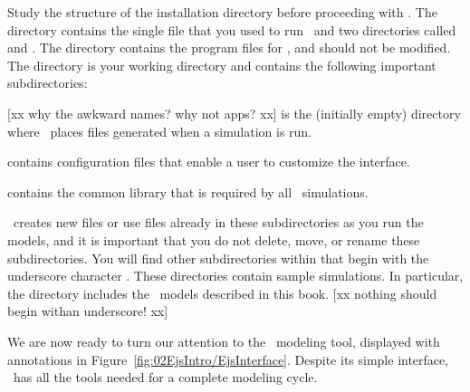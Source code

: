 Study the structure of the installation directory before proceeding with \ejs.  The  directory contains the single file  that you used to run \ejs\ and two
directories called  and . The  directory contains the program files for \ejs,
and should not be modified. The directory  is your working directory and contains the
following important subdirectories:
\begin{bulletlist}
  \item {} [xx why the awkward names? why not apps? xx] is the (initially empty) directory where \ejs\ places files generated when a simulation is run.
  \item {} contains configuration files that enable a user to customize the interface.
  \item {} contains the common library that is required by all \ejs\ simulations.
\end{bulletlist}
\ejs\ creates new files or use files already in these subdirectories as you run the models, and it is important that you do not
delete, move, or rename these subdirectories. You will find other subdirectories within  that begin
with the underscore character \lit{\file{\_}}. These directories contain sample simulations. In particular, the
 directory includes the \ejs\ models described in this book. [xx nothing should begin withan underscore! xx]

We are now ready to turn our attention to the \ejs\ modeling tool, displayed with annotations in
Figure~\ref{fig:02EjsIntro/EjsInterface}. Despite its simple interface, \ejs\ has all the tools needed for a complete
modeling cycle.

